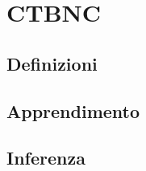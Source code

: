 
\chapter{\texorpdfstring{CTBNC}{\ctbnc{}}}
\label{cap:ctbnc}

\lipsum[1]

\section{Definizioni}
\lipsum[2]

\section{Apprendimento}
\lipsum[3-4]

\section{Inferenza}
\lipsum[5-7]
